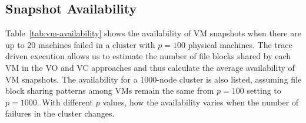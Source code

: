 \subsection{Snapshot Availability}

 Table~\ref{tab:vm-availability} shows the availability of VM snapshots when 
there are up to 20 machines failed in a cluster with $p=100$ physical machines.
The trace driven execution allows us to estimate the number of file blocks shared by each VM in the VO and VC approaches
and thus calculate the average availability of VM snapshots.
The availability for  a 1000-node cluster is also listed, assuming file block sharing patterns among VMs remain
the same from $p=100$ setting to $p=1000$. With different $p$ values, how the availability varies when 
the number of failures in the cluster changes.



